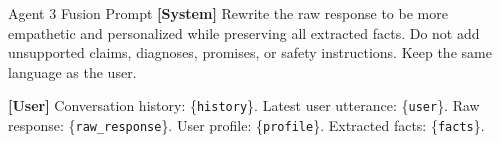\documentclass[11pt]{article}
\newcommand{\systemprompt}[1]{%
    \textbf{\textcolor{systemcolor}{[System]}} #1%
}
\newcommand{\userprompt}[1]{%
    \textbf{\textcolor{usercolor}{[User]}} #1%
}
\begin{document}
\begin{promptbox}{Agent 3 Fusion Prompt}
\small
\systemprompt{Rewrite the raw response to be more empathetic and personalized while preserving all extracted facts. Do not add unsupported claims, diagnoses, promises, or safety instructions. Keep the same language as the user.}
\userprompt{Conversation history: \{\texttt{history}\}. Latest user utterance: \{\texttt{user}\}. Raw response: \{\texttt{raw\_response}\}. User profile: \{\texttt{profile}\}. Extracted facts: \{\texttt{facts}\}.}
\end{promptbox}
\end{document}
